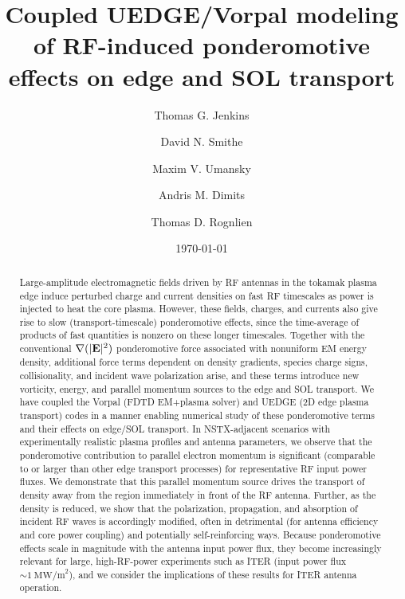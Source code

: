 \documentclass[%
 aip,
 amsmath,amssymb,
 reprint,%
]{revtex4-1}
\begin{document}

\title[Coupled UEDGE/Vorpal modeling of RF-induced ponderomotive effects on edge and SOL transport]{Coupled UEDGE/Vorpal modeling of RF-induced ponderomotive effects on edge and SOL transport} 
\author{Thomas G. Jenkins}
\author{David N. Smithe}
\author{Maxim V. Umansky}
\author{Andris M. Dimits}
\author{Thomas D. Rognlien}
 
\date{\today}

\begin{abstract}
Large-amplitude electromagnetic fields driven by RF antennas in the tokamak plasma edge induce perturbed 
charge and current densities on fast RF timescales as power is injected to heat the core plasma. However, 
these fields, charges, and currents also give rise to slow (transport-timescale) ponderomotive effects, since 
the time-average of products of fast quantities is nonzero on these longer timescales. Together with the 
conventional $\nabla(|{\bf E}|^{2})$ ponderomotive force associated with nonuniform EM energy density, 
additional force terms dependent on density gradients, species charge signs, collisionality, and incident 
wave polarization arise, and these terms introduce new vorticity, energy, and parallel momentum sources 
to the edge and SOL transport.  We have coupled the Vorpal (FDTD EM+plasma solver) and UEDGE (2D 
edge plasma transport) codes in a manner enabling numerical study of these ponderomotive terms and 
their effects on edge/SOL transport. In NSTX-adjacent scenarios with experimentally realistic plasma 
profiles and antenna parameters, we observe that the ponderomotive contribution to parallel electron 
momentum is significant (comparable to or larger than other edge transport processes) for representative 
RF input power fluxes. We demonstrate that this parallel momentum source drives the transport of density 
away from the region immediately in front of the RF antenna. Further, as the density is reduced, we show 
that the polarization, propagation, and absorption of incident RF waves is accordingly modified, often in 
detrimental (for antenna efficiency and core power coupling) and potentially self-reinforcing ways.  
Because ponderomotive effects scale in magnitude with the antenna input power flux, they become 
increasingly relevant for large, high-RF-power experiments such as ITER (input power flux 
$\sim 1~\mbox{MW/m}^2$), and we consider the implications of these results for ITER antenna operation.
\end{abstract}
\end{document}
